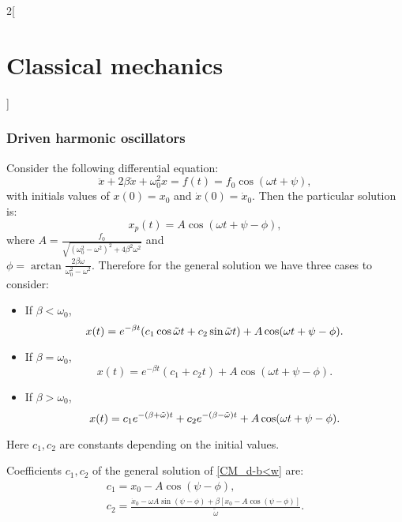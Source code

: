 \documentclass[../../../main.tex]{subfiles}
\begin{document}
\begin{multicols}{2}[\section{Classical mechanics}]
  \subsubsection{Driven harmonic oscillators}
  \begin{prop}
    Consider the following differential equation: $$\ddot{x}+2\beta\dot{x}+\omega_0^2 x=f(t)=f_0\cos(\omega t+\psi),$$ with initials values of $x(0)=x_0$ and $\dot{x}(0)=\dot{x}_0$. Then the particular solution is:
    $$x_p(t)=A\cos(\omega t+\psi-\phi),$$
    where $\displaystyle A=\frac{f_0}{\sqrt{{(\omega_0^2-\omega^2)}^2+4\beta^2\omega^2}}$ and\\ $\displaystyle\phi=\arctan{\frac{2\beta\omega}{\omega_0^2-\omega^2}}$. Therefore for the general solution we have three cases to consider:
    \begin{itemize}
      \item If $\beta<\omega_0$,
            \begin{equation}
              x(t)=e^{-\beta t}(c_1\cos\Tilde{\omega}t+c_2\sin\Tilde{\omega}t)+A\cos(\omega t+\psi-\phi).
              \label{CM_d-b<w}
            \end{equation}
      \item If $\beta=\omega_0$,
            \begin{equation}
              x(t)=e^{-\beta t}\left(c_1+c_2t\right)+A\cos(\omega t+\psi-\phi).
              \label{CM_d-b=w}
            \end{equation}
      \item If $\beta>\omega_0$,
            \begin{equation}
              x(t)=c_1e^{-(\beta+\Tilde{\omega})t}+c_2e^{-(\beta-\Tilde{\omega})t}+A\cos(\omega t+\psi-\phi).
              \label{CM_d-b>w}
            \end{equation}
    \end{itemize}
    Here $c_1,c_2$ are constants depending on the initial values.
  \end{prop}
  \begin{prop}
    Coefficients $c_1,c_2$ of the general solution of \cref{CM_d-b<w} are:
    \begin{gather*}
      c_1=x_0-A\cos\left(\psi-\phi\right),\\
      c_2=\frac{\dot{x}_0-\omega A\sin\left(\psi-\phi\right)+\beta\left[x_0-A\cos\left(\psi-\phi\right)\right]}{\tilde{\omega}}.
    \end{gather*}
  \end{prop}

\end{multicols}
\end{document}
